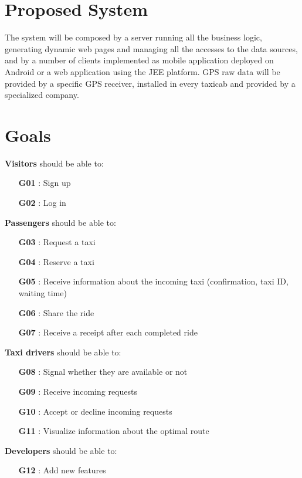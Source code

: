 \section{Proposed System}
The system will be composed by a server running all the business logic, generating dynamic web pages and managing all the accesses to the data sources, and by a number of clients implemented as mobile application deployed on Android or a web application using the JEE platform. GPS raw data will be provided by a specific GPS receiver, installed in every taxicab and provided by a specialized company.

\section{Goals}
\noindent \textbf{Visitors} should be able to:
\begin{itemize}
	\item [\textbf{G01}] : Sign up 
	\item [\textbf{G02}] : Log in\\
\end{itemize}

\noindent \textbf{Passengers} should be able to:
\begin{itemize}
	\item [\textbf{G03}] : Request a taxi
	\item [\textbf{G04}] : Reserve a taxi
	\item [\textbf{G05}] : Receive information about the incoming taxi (confirmation, taxi ID, waiting time)
	\item [\textbf{G06}] : Share the ride
	\item [\textbf{G07}] : Receive a receipt after each completed ride\\
\end{itemize}

\noindent \textbf{Taxi drivers} should be able to:
\begin{itemize}
	\item [\textbf{G08}] : Signal whether they are available or not
	\item [\textbf{G09}] : Receive incoming requests
	\item [\textbf{G10}] : Accept or decline incoming requests
	\item [\textbf{G11}] : Visualize information about the optimal route\\
\end{itemize}

\noindent \textbf{Developers} should be able to:
\begin{itemize}
	\item [\textbf{G12}] : Add new features
\end{itemize}

